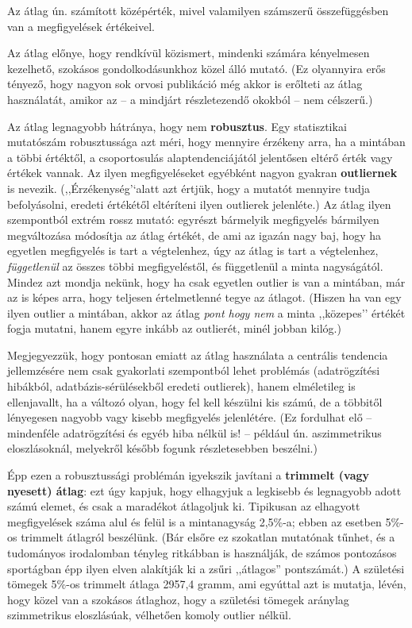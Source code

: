 \documentclass[]{book}
\begin{document}
Az átlag ún. számított középérték, mivel valamilyen számszerű
összefüggésben van a megfigyelések értékeivel.

Az átlag előnye, hogy rendkívül közismert, mindenki számára kényelmesen
kezelhető, szokásos gondolkodásunkhoz közel álló mutató. (Ez olyannyira
erős tényező, hogy nagyon sok orvosi publikáció még akkor is erőlteti az
átlag használatát, amikor az -- a mindjárt részletezendő okokból -- nem
célszerű.)

Az átlag legnagyobb hátránya, hogy nem \textbf{robusztus}. Egy
statisztikai mutatószám robusztussága azt méri, hogy mennyire érzékeny
arra, ha a mintában a többi értéktől, a csoportosulás alaptendenciájától
jelentősen eltérő érték vagy értékek vannak. Az ilyen megfigyeléseket
egyébként nagyon gyakran \textbf{outliernek} is nevezik.
(,,Érzékenység'`alatt azt értjük, hogy a mutatót mennyire tudja
befolyásolni, eredeti értékétől eltéríteni ilyen outlierek jelenléte.)
Az átlag ilyen szempontból extrém rossz mutató: egyrészt bármelyik
megfigyelés bármilyen megváltozása módosítja az átlag értékét, de ami az
igazán nagy baj, hogy ha egyetlen megfigyelés is tart a végtelenhez, úgy
az átlag is tart a végtelenhez, \emph{függetlenül} az összes többi
megfigyeléstől, és függetlenül a minta nagyságától. Mindez azt mondja
nekünk, hogy ha csak egyetlen outlier is van a mintában, már az is képes
arra, hogy teljesen értelmetlenné tegye az átlagot. (Hiszen ha van egy
ilyen outlier a mintában, akkor az átlag \emph{pont hogy nem} a minta
,,közepes'' értékét fogja mutatni, hanem egyre inkább az outlierét,
minél jobban kilóg.)

Megjegyezzük, hogy pontosan emiatt az átlag használata a centrális
tendencia jellemzésére nem csak gyakorlati szempontból lehet problémás
(adatrögzítési hibákból, adatbázis-sérülésekből eredeti outlierek),
hanem elméletileg is ellenjavallt, ha a változó olyan, hogy fel kell
készülni kis számú, de a többitől lényegesen nagyobb vagy kisebb
megfigyelés jelenlétére. (Ez fordulhat elő -- mindenféle adatrögzítési
és egyéb hiba nélkül is! -- például ún. aszimmetrikus eloszlásoknál,
melyekről később fogunk részletesebben beszélni.)

Épp ezen a robusztussági problémán igyekszik javítani a \textbf{trimmelt
(vagy nyesett) átlag}: ezt úgy kapjuk, hogy elhagyjuk a legkisebb és
legnagyobb adott számú elemet, és csak a maradékot átlagoljuk ki.
Tipikusan az elhagyott megfigyelések száma alul és felül is a
mintanagyság 2,5\%-a; ebben az esetben 5\%-os trimmelt átlagról
beszélünk. (Bár elsőre ez szokatlan mutatónak tűnhet, és a tudományos
irodalomban tényleg ritkábban is használják, de számos pontozásos
sportágban épp ilyen elven alakítják ki a zsűri ,,átlagos'' pontszámát.)
A születési tömegek 5\%-os trimmelt átlaga 2957,4 gramm, ami egyúttal
azt is mutatja, lévén, hogy közel van a szokásos átlaghoz, hogy a
születési tömegek aránylag szimmetrikus eloszlásúak, vélhetően komoly
outlier nélkül.
\end{document}
